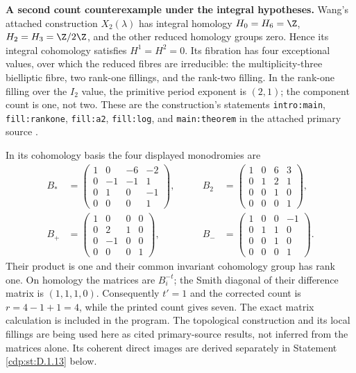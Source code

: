 
\begin{proposition}[Refuted]\label{cdp:st:D.1.6}

\textbf{A second count counterexample under the integral hypotheses.}
Wang's attached construction $X_2(\lambda)$ has integral homology
$H_0=H_6=\Z$, $H_2=H_3=\Z/2\Z$, and the other reduced
homology groups zero. Hence its integral cohomology satisfies
$H^1=H^2=0$. Its fibration has four exceptional values, over which
the reduced fibres are irreducible: the multiplicity-three
bielliptic fibre, two rank-one fillings, and the rank-two filling.
In the rank-one filling over the $I_2$ value, the primitive period
exponent is $(2,1)$; the component count is one, not two.
These are the construction's statements
\texttt{intro:main}, \texttt{fill:rankone},
\texttt{fill:a2}, \texttt{fill:log}, and
\texttt{main:theorem} in the attached primary source
\cite{Wang2026}.

In its cohomology basis the four displayed monodromies are
\[
\begin{aligned}
B_*&=\begin{pmatrix}1&0&-6&-2\\0&-1&-1&1\\0&1&0&-1\\0&0&0&1\end{pmatrix},&\qquad
B_2&=\begin{pmatrix}1&0&6&3\\0&1&2&1\\0&0&1&0\\0&0&0&1\end{pmatrix},\\
B_+&=\begin{pmatrix}1&0&0&0\\0&2&1&0\\0&-1&0&0\\0&0&0&1\end{pmatrix},&\qquad
B_-&=\begin{pmatrix}1&0&0&-1\\0&1&1&0\\0&0&1&0\\0&0&0&1\end{pmatrix}.
\end{aligned}
\]
Their product is one and their common invariant cohomology group
has rank one. On homology the matrices are $B_i^{-t}$; the Smith
diagonal of their difference matrix is $(1,1,1,0)$. Consequently
$t'=1$ and the corrected count is $r=4-1+1=4$, while the printed
count gives seven. The exact matrix calculation is included in the
program. The topological construction and its local fillings are
being used here as cited primary-source results, not inferred from
the matrices alone. Its coherent direct images are derived separately
in Statement \ref{cdp:st:D.1.13} below.
\end{proposition}


